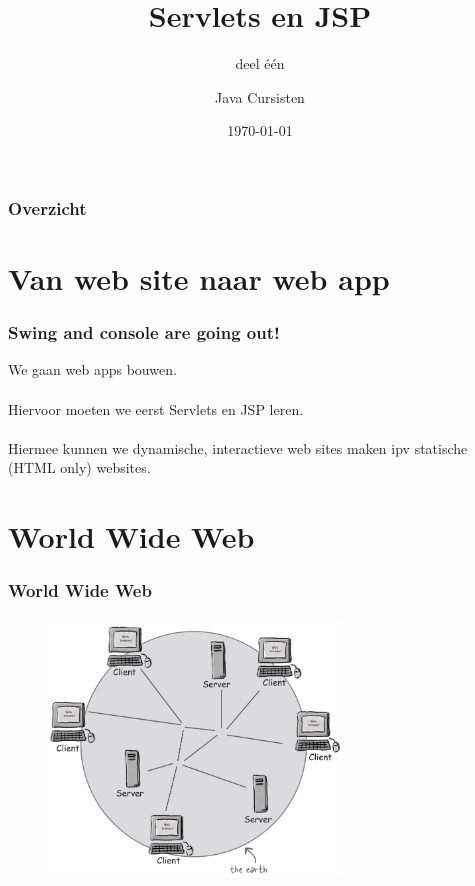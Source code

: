 \documentclass{beamer}
\title{Servlets en JSP}
\subtitle{deel \'e\'en}
\author{Java Cursisten}
\institute{INTEC Brussel}
\date{\today}
\begin{document}
\begin{frame}

\titlepage

\end{frame}


\begin{frame}

\frametitle{Overzicht}
\tableofcontents

\end{frame}


\section{Van web site naar web app}


\begin{frame}

\frametitle{Swing and console are going out!}

{\LARGE We gaan web apps bouwen.\\~\\

Hiervoor moeten we eerst Servlets en JSP leren.\\~\\

Hiermee kunnen we dynamische, interactieve web sites maken ipv statische (HTML only) websites.}

\end{frame}


\section{World Wide Web}


\begin{frame}

\frametitle{World Wide Web}

\begin{figure}

\includegraphics[width=220pt]{FigureOne.png}

\end{figure}

\end{frame}
\end{document}
